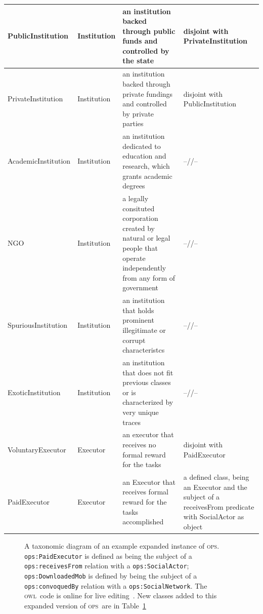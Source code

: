 \documentclass[10pt,letterpaper]{article}
\newcommand{\ops}{\textsc{ops}}
\newcommand{\owl}{\textsc{owl}}
\begin{document}
\begin{table}[!h]
\begin{adjustwidth}{-2.25in}{0in}
\begin{tabular}{|l|l|p{5.4cm}|p{5.3cm}|}
PublicInstitution & Institution & an institution backed through public funds and controlled by the state & disjoint with PrivateInstitution \\ \hline
PrivateInstitution & Institution & an institution backed through private fundings and controlled by private parties & disjoint with PublicInstitution \\ \hline
AcademicInstitution & Institution & an institution dedicated to education and research, which grants academic degrees & --//-- \\ \hline
NGO & Institution & a legally consituted corporation created by natural or legal people that operate independently from any form of government & --//-- \\\hline
SpuriousInstitution & Institution & an institution that holds prominent illegitimate or corrupt characteristcs & --//-- \\\hline
ExoticInstitution & Institution & an institution that does not fit previous classes or is characterized by very unique traces & --//-- \\\hline\hline
VoluntaryExecutor & Executor & an executor that receives no formal reward for the tasks & disjoint with PaidExecutor \\ \hline
PaidExecutor & Executor & an Executor that receives formal reward for the tasks accomplished & a defined class, being an Executor and the subject of a receivesFrom predicate with SocialActor as object\\ \hline
  \end{tabular}
  \label{ospFooClass}
\end{adjustwidth}
\end{table}

\begin{figure}[!h]
        \caption{A taxonomic diagram of an example expanded instance of \ops. {\tt ops:PaidExecutor} is defined as being the subject of a \texttt{ops:receivesFrom} relation with a \texttt{ops:SocialActor}; \texttt{ops:DownloadedMob} is defined by being the subject of a \texttt{ops:convoquedBy} relation with a \texttt{ops:SocialNetwork}. The \owl\ code is online for live editing~\cite{owlExp}. New classes added to this expanded version of \ops\ are in Table~\ref{ospFooClass}}
    \label{fig:owlExp}
    \end{figure}
\end{document}
